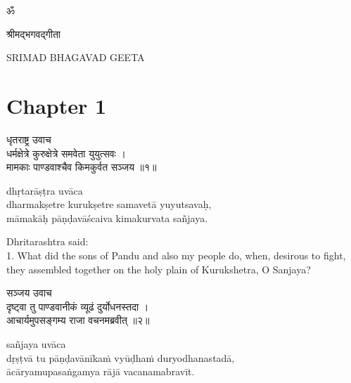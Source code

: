 \chapterdrop

\begin{center}
\sanskrit\fontsize{28pt}{28pt}\selectfont
ॐ

\vspace{0.25em}
\sanskrit\LARGE
श्रीमद्भगवद्गीता

\vspace{0.5em}
\normalfont\normalsize
SRIMAD BHAGAVAD GEETA

\headerspace
{}

\headerspace
{}

\section{Chapter 1}

\headerspace
{}

\headerspace
{}

\headerspace
{}

\headerspace
\end{center}

\begin{gitaverse}
धृतराष्ट्र उवाच \\
धर्मक्षेत्रे कुरुक्षेत्रे समवेता युयुत्सवः । \\
मामकाः पाण्डवाश्चैव किमकुर्वत सञ्जय ॥१॥
\end{gitaverse}

\begin{transliteration}
dhṛtarāṣṭra uvāca \\
dharmakṣetre kurukṣetre samavetā yuyutsavaḥ, \\
māmakāḥ pāṇḍavāścaiva kimakurvata sañjaya.
\end{transliteration}

Dhritarashtra said: \\
1. What did the sons of Pandu and also my people do, when, desirous to fight,
they assembled together on the holy plain of Kurukshetra, O Sanjaya?

\begin{gitaverse}
सञ्जय उवाच \\
दृष्ट्वा तु पाण्डवानीकं व्यूढं दुर्योधनस्तदा । \\
आचार्यमुपसङ्गम्य राजा वचनमब्रवीत् ॥२॥
\end{gitaverse}

\begin{transliteration}
sañjaya uvāca \\
dṛṣṭvā tu pāṇḍavānīkaṁ vyūḍhaṁ duryodhanastadā, \\
ācāryamupasaṅgamya rājā vacanamabravīt.
\end{transliteration}

